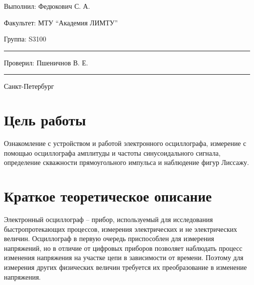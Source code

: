 \documentclass[12pt]{article}
\begin{document}
\begin{flushright}
\large
Выполнил: Федюкович  С. А.
\par\bigskip
Факультет: МТУ “Академия ЛИМТУ”
\par\bigskip
Группа: S3100                       
\par\bigskip\par\bigskip\par\bigskip

\rule{150pt}{0.5pt}
\par\bigskip\par\bigskip\par\bigskip\par\bigskip                                                            
 Проверил: Пшеничнов В. Е.
\par\bigskip \par\bigskip

\rule{150pt}{0.5pt}
\end{flushright}
\par\bigskip\par\bigskip\par\bigskip\par\bigskip\par\bigskip\par\bigskip\par\bigskip\par\bigskip\par\bigskip\par\bigskip     
\begin{center}
\large
Санкт-Петербург
\par{}
\end{center}
\newpage
\section*{Цель работы}
Ознакомление с устройством и работой электронного осциллографа, измерение с помощью осциллографа амплитуды и частоты синусоидального сигнала, определение скважности прямоугольного импульса и наблюдение фигур Лиссажу.
\section*{Краткое теоретическое описание}
Электронный осциллограф – прибор, используемый для исследования быстропротекающих процессов, измерения электрических и не электрических величин. Осциллограф в первую очередь приспособлен для измерения напряжений, но в отличие от цифровых приборов позволяет наблюдать процесс изменения напряжения на участке цепи в зависимости от времени. Поэтому для измерения других физических величин требуется их преобразование в изменение напряжения.
\end{document}
